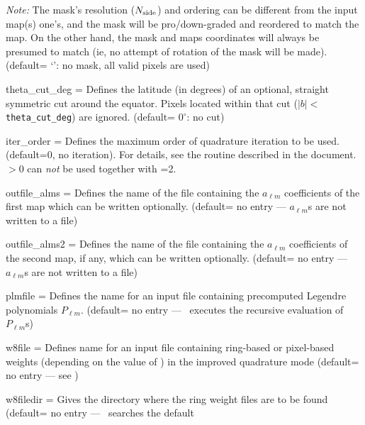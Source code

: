 \begin{qualifiers}
\begin{qulist}{}
{\em Note:} The mask's resolution ($N_{\mathrm{side}}$) and ordering can be different from the input map(s)
one's, and the mask will be pro/down-graded and reordered to match the map. On the
other hand, the mask and maps coordinates will always be presumed to match (ie, no
attempt of rotation of the mask will be made).
(default= `': no mask, all valid pixels are used)
 \item[{theta\_cut\_deg = }]%
 Defines the latitude (in degrees) of 
an optional, straight symmetric cut around the equator.  Pixels located within
that cut ($|b|<${\tt theta\_cut\_deg}) are ignored.
(default= $0^\circ$: no cut)
 \item[{iter\_order = }]%
 Defines the maximum order of quadrature 
iteration to be used. (default=0, no iteration).
For details, see the  routine
described in the  document.
$>0$ can {\em not} be used together with =2.
 \item[{outfile\_alms = }]%
 Defines the name of the file 
containing the $a_{\ell m}$  coefficients of the first map
which can be written optionally.   (default= no entry ---
$a_{\ell m}$s are not written to a file)
 \item[{outfile\_alms2 = }]%
 Defines the name of the file 
containing the $a_{\ell m}$  coefficients of the second map, if any,
which can be written optionally.   (default= no entry ---
$a_{\ell m}$s are not written to a file)
 \item[{plmfile = }]%
 Defines the name for an input file
    containing  precomputed Legendre polynomials $P_{\ell m}$.
(default= no entry --- \thedocid\ executes the recursive evaluation 
of $P_{\ell m}$s)
\item[{w8file = }]%
 Defines name for an input file containing ring-based or pixel-based
  weights (depending on the value of ) in the improved quadrature mode (default= no entry ---
see )
\item[{w8filedir = }]%
 Gives the directory where the ring weight files are
to be found (default= no entry --- \thedocid\ searches the default

\end{qulist}
\end{qualifiers}
